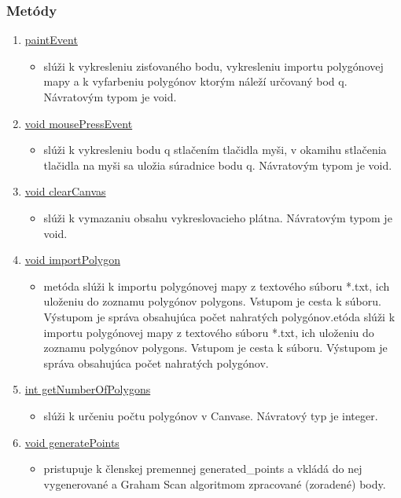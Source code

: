 \documentclass[12pt]{article}
\begin{document}
\subsubsection{Metódy}
\begin{enumerate}
\item[] \underline{paintEvent}
\begin{itemize}
\item slúži k vykresleniu zisťovaného bodu, vykresleniu importu polygónovej mapy a k vyfarbeniu polygónov ktorým náleží určovaný bod q. Návratovým typom je void.
\end{itemize}
\item[] \underline{void mousePressEvent}
\begin{itemize}
\item slúži k vykresleniu bodu q stlačením tlačidla myši, v okamihu stlačenia tlačidla na myši sa uložia súradnice bodu q. Návratovým typom je void.
\end{itemize}
\item[] \underline{void clearCanvas}
\begin{itemize}
\item slúži k vymazaniu obsahu vykreslovacieho plátna. Návratovým typom je void.
\end{itemize}
\item[] \underline{void importPolygon}
\begin{itemize}
\item metóda slúži k importu polygónovej mapy z textového súboru *.txt, ich uloženiu do zoznamu polygónov polygons. Vstupom je cesta k súboru. Výstupom je správa obsahujúca počet nahratých polygónov.etóda slúži k importu polygónovej mapy z textového súboru *.txt, ich uloženiu do zoznamu polygónov polygons. Vstupom je cesta k súboru. Výstupom je správa obsahujúca počet nahratých polygónov.
\end{itemize}
\item[] \underline{int getNumberOfPolygons}
\begin{itemize}
\item slúži k určeniu počtu polygónov v Canvase. Návratový typ je integer.
\end{itemize}
\item[] \underline{void generatePoints}
\begin{itemize}
\item pristupuje k členskej premennej generated\_points a vkládá do nej vygenerované a Graham Scan algoritmom zpracované (zoradené) body.
\end{itemize}
\end{enumerate}
\end{document}
